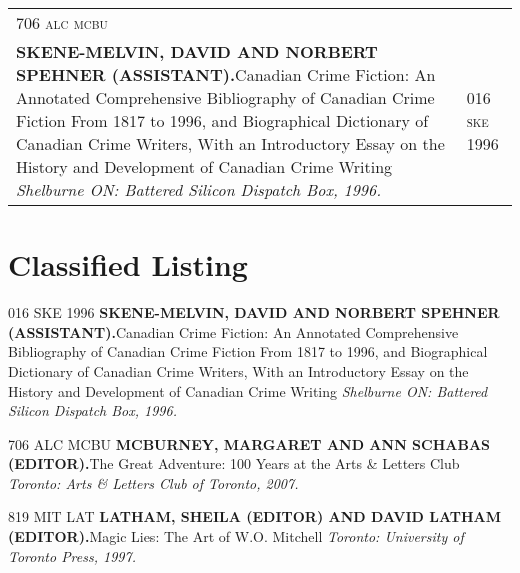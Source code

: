 \documentclass[10pt]{article}
\begin{document}
\begin{longtable}{p{} l}
\MakeLowercase{\textsc{706 ALC MCBU}} \\


{\MakeUppercase{\textsf{\textbf{\textbf{Skene-Melvin, David} and \textbf{Norbert Spehner} (Assistant).}}}}\hspace{2em}Canadian Crime Fiction: An Annotated Comprehensive Bibliography of Canadian Crime Fiction From 1817 to 1996, and Biographical Dictionary of Canadian Crime Writers, With an Introductory Essay on the History and Development of Canadian Crime Writing
\newline
\textit{Shelburne ON: Battered Silicon Dispatch Box, 1996.}\newline
&

\MakeLowercase{\textsc{016 SKE 1996}} \\


\end{longtable}

\newpage

\section*{Classified Listing}

\noindent



016 SKE 1996\newline
\MakeUppercase{\textsf{\textbf{\textbf{Skene-Melvin, David} and \textbf{Norbert Spehner} (Assistant).}}}\hspace{1em}\textsf{Canadian Crime Fiction: An Annotated Comprehensive Bibliography of Canadian Crime Fiction From 1817 to 1996, and Biographical Dictionary of Canadian Crime Writers, With an Introductory Essay on the History and Development of Canadian Crime Writing}
\newline
\textit{Shelburne ON: Battered Silicon Dispatch Box, 1996.}\newline


706 ALC MCBU\newline
\MakeUppercase{\textsf{\textbf{\textbf{McBurney, Margaret} and \textbf{Ann Schabas} (Editor).}}}\hspace{1em}\textsf{The Great Adventure: 100 Years at the Arts \& Letters Club}
\newline
\textit{Toronto: Arts \& Letters Club of Toronto, 2007.}\newline


819 MIT LAT\newline
\MakeUppercase{\textsf{\textbf{\textbf{Latham, Sheila} (Editor) and \textbf{David Latham} (Editor).}}}\hspace{1em}\textsf{Magic Lies: The Art of W.O. Mitchell}
\newline
\textit{Toronto: University of Toronto Press, 1997.}\newline
\end{document}

